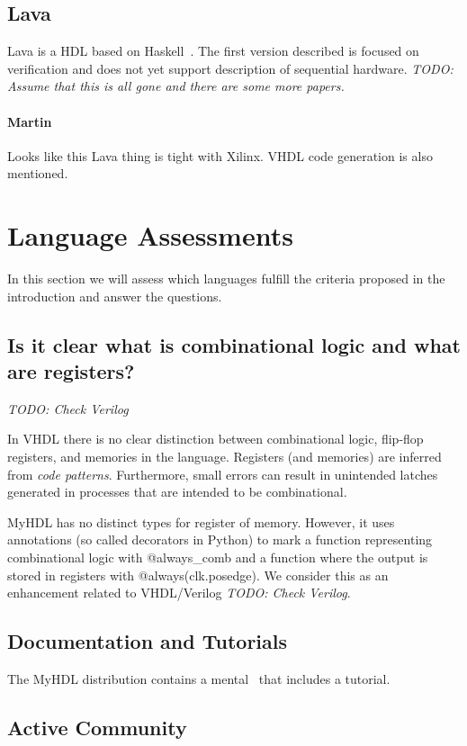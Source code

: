 \documentclass[a4paper, conference]{IEEEtran}
\newcommand{\code}[1]{{\small{\textsf{#1}}}}
\newcommand{\todo}[1]{{\emph{TODO: #1}}}
\newcommand{\comment}[3]{\paragraph*{\textbf{#1}}{\color{#3}#2}}
\newcommand{\martin}[1]{\comment{Martin}{#1}{Blue}}
\begin{document}
\subsection{Lava}

Lava is a HDL based on Haskell~\cite{Lava:1998}. The first version described
is focused on verification and does not yet support description of sequential
hardware. \todo{Assume that this is all gone and there are some more papers.}

\martin{Looks like this Lava thing is tight with Xilinx. VHDL code generation
is also mentioned.}

\section{Language Assessments}

In this section we will assess which languages fulfill the criteria proposed in
the introduction and answer the questions.

\subsection{Is it clear what is combinational logic and what are registers?}

\todo{Check Verilog}

In VHDL there is no clear distinction between combinational logic, flip-flop
registers,  and memories in the language. Registers (and memories) are
inferred from \emph{code patterns}. Furthermore, small errors can result
in unintended latches generated in processes that are intended to be combinational.

MyHDL has no distinct types for register of memory. However, it uses annotations
(so called decorators in Python) to mark a function representing
combinational logic with \code{@always\_comb} and a function where the
output is stored in registers with \code{@always(clk.posedge)}. We consider
this as an enhancement related to VHDL/Verilog \todo{Check Verilog}.

\subsection{Documentation and Tutorials}

The MyHDL distribution contains a mental~\cite{myhdl:2010} that includes
a tutorial.

\subsection{Active Community}
\end{document}
